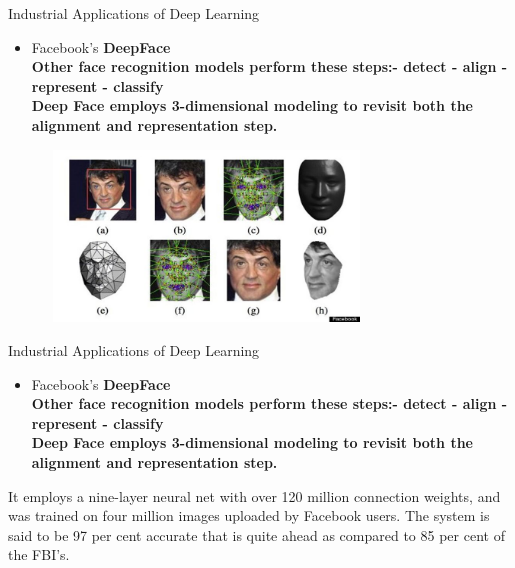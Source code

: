 \documentclass[10pt]{beamer}
\begin{document}
	\begin{frame}[t]{Industrial Applications of Deep Learning}
		\begin{itemize}
			\item \large{Facebook's \textbf{DeepFace}}
			\\
			\bigskip
			\textbf{Other face recognition models perform these steps:- detect - align - represent - classify
			\\
			\bigskip	
			Deep Face employs 3-dimensional modeling to revisit both the alignment and representation step.
			}
		\end{itemize}
		\pause
		\begin{figure}
			\includegraphics[width=3.3in,height=1.8in]{images/im}
		\end{figure}
	\end{frame}
	\begin{frame}[t]{Industrial Applications of Deep Learning}
		\begin{itemize}
			\item \large{Facebook's \textbf{DeepFace}}
			\\
			\bigskip
			\textbf{Other face recognition models perform these steps:- detect - align - represent - classify
			\\
			\bigskip	
			Deep Face employs 3-dimensional modeling to revisit both the alignment and representation step.
			}
		\end{itemize}
		\bigskip
		It employs a nine-layer neural net with over 120 million connection weights, and was trained on four million images uploaded by Facebook users. The system is said to be 97 per cent accurate that is quite ahead as compared to 85 per cent of the FBI's. 
	\end{frame}
\end{document}
